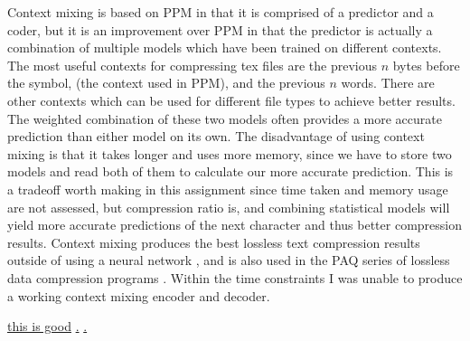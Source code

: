 \documentclass[a4paper, 11pt]{article}
\numberwithin{equation}{section}
\theoremstyle{plain}
\theoremstyle{definition}
\begin{document}
Context mixing is based on PPM in that it is comprised of a predictor and a coder, but it is an improvement 
over PPM in that the predictor is actually a combination of multiple models which have been trained on 
different contexts. 
The most useful contexts for compressing tex files are the previous $n$ bytes before the symbol, 
(the context used in PPM), and the previous $n$ words. 
There are other contexts which can be used for different file types to achieve better results. 
The weighted combination of these two models often provides a more accurate prediction than either 
model on its own. 
The disadvantage of using context mixing is that it takes longer and uses more memory, since we have to 
store two models and read both of them to calculate our more accurate prediction. 
This is a tradeoff worth making in this assignment since time taken and memory usage are not assessed, but 
compression ratio is, and combining statistical models will yield more accurate predictions of the next 
character and thus better compression results. 
Context mixing produces the best lossless text compression results outside of using a neural network \cite{TextBenchmark}, 
and is also used in the PAQ series of lossless data compression programs \cite{TextCompression}. 
Within the time constraints I was unable to produce a working context mixing encoder and decoder. 


\href{https://sites.google.com/site/datacompressionguide/}{this is good}
\href{https://en.wikipedia.org/wiki/PAQ}{.}
\href{https://tarsa.github.io/lossless-benchmark/}{.}





\end{document}
